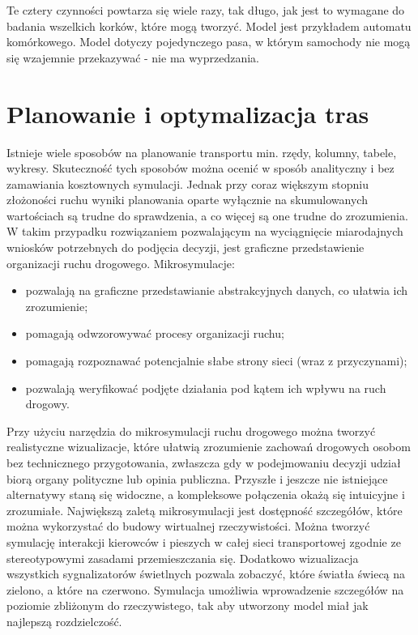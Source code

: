 \documentclass{sprawozdanie-agh}
\begin{document}
		Te cztery czynności powtarza się wiele razy, tak długo, jak jest to wymagane do badania wszelkich korków, które mogą tworzyć. Model jest przykładem automatu komórkowego. Model dotyczy pojedynczego pasa, w którym samochody nie mogą się wzajemnie przekazywać - nie ma wyprzedzania.



		\section{Planowanie i optymalizacja tras}

		Istnieje wiele sposobów na planowanie transportu min. rzędy, kolumny, tabele, wykresy. Skuteczność tych sposobów można ocenić w sposób analityczny i bez zamawiania kosztownych symulacji. Jednak przy coraz większym stopniu złożoności ruchu wyniki planowania oparte wyłącznie na skumulowanych wartościach są trudne do sprawdzenia, a co więcej są one trudne do zrozumienia. W takim przypadku rozwiązaniem pozwalającym na wyciągnięcie miarodajnych wniosków potrzebnych do podjęcia decyzji, jest graficzne przedstawienie organizacji ruchu drogowego. Mikrosymulacje:

		\begin{itemize}
			\item pozwalają na graficzne przedstawianie abstrakcyjnych danych, co ułatwia ich zrozumienie;
			\item pomagają odwzorowywać procesy organizacji ruchu;
			\item pomagają rozpoznawać potencjalnie słabe strony sieci (wraz z przyczynami);
			\item pozwalają weryfikować podjęte działania pod kątem ich wpływu na ruch drogowy.
		\end{itemize}

		Przy użyciu narzędzia do mikrosymulacji ruchu drogowego można tworzyć realistyczne wizualizacje, które ułatwią zrozumienie zachowań drogowych osobom bez technicznego przygotowania, zwłaszcza gdy w podejmowaniu decyzji udział biorą organy polityczne lub opinia publiczna. Przyszłe i jeszcze nie istniejące alternatywy staną się widoczne, a kompleksowe połączenia okażą się intuicyjne i zrozumiałe.
		Największą zaletą mikrosymulacji jest dostępność szczegółów, które można wykorzystać do budowy wirtualnej rzeczywistości. Można tworzyć symulację interakcji kierowców i pieszych w całej sieci transportowej zgodnie ze stereotypowymi zasadami przemieszczania się. Dodatkowo wizualizacja wszystkich sygnalizatorów świetlnych pozwala zobaczyć, które światła świecą na zielono, a które na czerwono. Symulacja umożliwia wprowadzenie szczegółów na poziomie zbliżonym do rzeczywistego, tak aby utworzony model miał jak najlepszą rozdzielczość.
\end{document}
